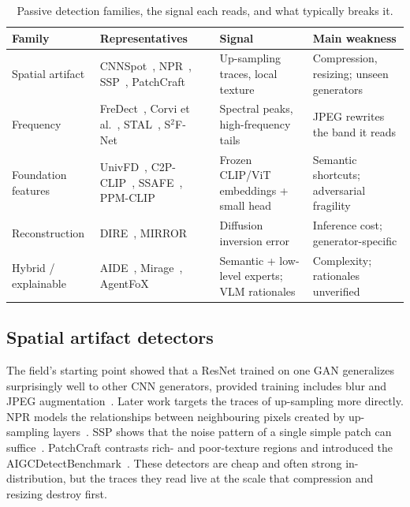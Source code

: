 \documentclass[conference]{IEEEtran}
\begin{document}
\begin{table}[t]
\caption{Passive detection families, the signal each reads, and what
typically breaks it.}
\label{tab:families}
\centering
\footnotesize
\setlength{\tabcolsep}{3pt}
\begin{tabular}{@{}p{1.45cm}p{2.15cm}p{2.0cm}p{2.0cm}@{}}
\toprule
Family & Representatives & Signal & Main weakness \\
\midrule
Spatial artifact & CNNSpot~\cite{wang2020cnnspot}, NPR~\cite{tan2024npr}, SSP~\cite{chen2024ssp}, PatchCraft~\cite{zhong2023patchcraft}
  & Up-sampling traces, local texture & Compression, resizing; unseen generators \\
Frequency & FreDect~\cite{frank2020fredect}, Corvi et al.~\cite{corvi2023detection}, STAL~\cite{li2026stal}, S$^2$F-Net~\cite{hu2026s2fnet}
  & Spectral peaks, high-frequency tails & JPEG rewrites the band it reads \\
Foundation features & UnivFD~\cite{ojha2023univfd}, C2P-CLIP~\cite{tan2025c2pclip}, SSAFE~\cite{lee2026ssafe}, PPM-CLIP~\cite{wang2026ppmclip}
  & Frozen CLIP/ViT embeddings + small head & Semantic shortcuts; adversarial fragility~\cite{derosa2024clipadv} \\
Recon\-struction & DIRE~\cite{wang2023dire}, MIRROR~\cite{liu2026mirror}
  & Diffusion inversion error & Inference cost; generator-specific \\
Hybrid / explainable & AIDE~\cite{yan2025aide}, Mirage~\cite{sharma2025mirage}, AgentFoX~\cite{yu2026agentfox}
  & Semantic + low-level experts; VLM rationales & Complexity; rationales unverified \\
\bottomrule
\end{tabular}
\end{table}

\subsection{Spatial artifact detectors}
The field's starting point showed that a ResNet trained on one GAN
generalizes surprisingly well to other CNN generators, provided training
includes blur and JPEG augmentation~\cite{wang2020cnnspot}. Later work
targets the traces of up-sampling more directly. NPR models the
relationships between neighbouring pixels created by up-sampling
layers~\cite{tan2024npr}. SSP shows that the noise pattern of a single
simple patch can suffice~\cite{chen2024ssp}. PatchCraft contrasts rich- and
poor-texture regions and introduced the AIGCDetectBenchmark~\cite{zhong2023patchcraft}.
These detectors are cheap and often strong in-distribution, but the traces
they read live at the scale that compression and resizing destroy first.
\end{document}

